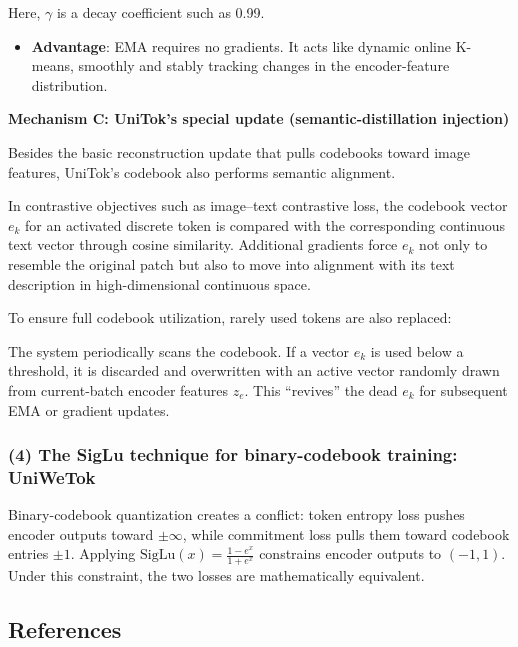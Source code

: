 Here, \(\gamma\) is a decay coefficient such as 0.99.

\begin{itemize}
\tightlist
\item
  \textbf{Advantage}: EMA requires no gradients. It acts like dynamic online K-means, smoothly and stably tracking changes in the encoder-feature distribution.
\end{itemize}

\textbf{Mechanism C: UniTok's special update (semantic-distillation injection)}

Besides the basic reconstruction update that pulls codebooks toward image features, UniTok's codebook also performs semantic alignment.

In contrastive objectives such as image--text contrastive loss, the codebook vector \(e_k\) for an activated discrete token is compared with the corresponding continuous text vector through cosine similarity. Additional gradients force \(e_k\) not only to resemble the original patch but also to move into alignment with its text description in high-dimensional continuous space.

To ensure full codebook utilization, rarely used tokens are also replaced:

The system periodically scans the codebook. If a vector \(e_k\) is used below a threshold, it is discarded and overwritten with an active vector randomly drawn from current-batch encoder features \(z_e\). This ``revives'' the dead \(e_k\) for subsequent EMA or gradient updates.

\hypertarget{the-siglu-technique-for-binary-codebook-training-uniwetok}{%
\subsubsection{(4) The SigLu technique for binary-codebook training: UniWeTok}\label{the-siglu-technique-for-binary-codebook-training-uniwetok}}

Binary-codebook quantization creates a conflict: token entropy loss pushes encoder outputs toward \(\pm\infty\), while commitment loss pulls them toward codebook entries \(\pm1\). Applying \(\mathrm{SigLu}(x)=\frac{1-e^x}{1+e^x}\) constrains encoder outputs to \((-1,1)\). Under this constraint, the two losses are mathematically equivalent.

\FloatBarrier
{}
\hypertarget{references-146}{%
\subsection{References}\label{references-146}}


